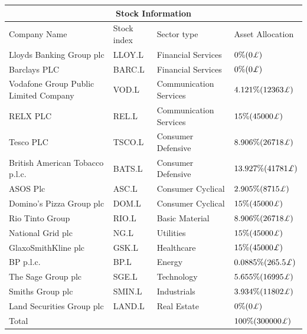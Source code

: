 \begin{center}
\begin{tabular}{ |p{4cm}|p{1.5cm}|p{2.5cm}|p{2.5cm}|  }
\hline
\multicolumn{4}{|c|}{Stock Information} \\

\hline
Company Name& Stock index & Sector type & Asset Allocation\\
\hline
Lloyds Banking Group plc & LLOY.L & Financial Services & $0\% (0 \textit{\pounds} )$ \\
\hline
Barclays PLC & BARC.L & Financial Services & $0\% (0 \textit{\pounds} )$\\
\hline
Vodafone Group Public Limited Company & VOD.L & Communication Services & $4.121\% (12363 \textit{\pounds})$ \\
\hline
RELX PLC & REL.L & Communication Services & $15\% (45000 \textit{\pounds})$ \\
\hline
Tesco PLC & TSCO.L & Consumer Defensive & $8.906\% (26718 \textit{\pounds})$ \\
\hline
British American Tobacco p.l.c. & BATS.L & Consumer Defensive & $13.927\% (41781 \textit{\pounds})$ \\
\hline
ASOS Plc & ASC.L & Consumer Cyclical & $2.905\% (8715 \textit{\pounds})$ \\
\hline
Domino's Pizza Group plc & DOM.L & Consumer Cyclical & $15\% (45000 \textit{\pounds})$ \\
\hline
Rio Tinto Group & RIO.L & Basic Material & $8.906\% (26718 \textit{\pounds})$ \\
\hline
National Grid plc & NG.L & Utilities & $15\% (45000 \textit{\pounds})$ \\
\hline
GlaxoSmithKline plc & GSK.L & Healthcare & $15\% (45000 \textit{\pounds})$\\
\hline
BP p.l.c. & BP.L & Energy & $0.0885\% (265.5 \textit{\pounds})$ \\
\hline
The Sage Group plc & SGE.L & Technology & $5.655\% (16995 \textit{\pounds})$ \\
\hline
Smiths Group plc & SMIN.L & Industrials & $3.934\% (11802 \textit{\pounds})$ \\
\hline
Land Securities Group plc & LAND.L & Real Estate & $0\% (0 \textit{\pounds} )$ \\
\hline
Total & & & $100\% (300000 \textit{\pounds} )$\\
\hline
\end{tabular}
\end{center}

\newpage